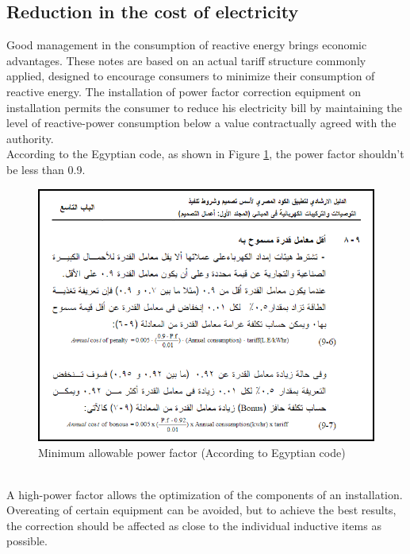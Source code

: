 \documentclass[12pt,fleqn]{book} %
\begin{document}
\subsection{Reduction in the cost of electricity}
Good management in the consumption of reactive energy brings economic advantages. These notes are based on an actual tariff structure commonly applied, designed to encourage consumers to minimize their consumption of reactive energy. The installation of power factor correction equipment on installation permits the consumer to reduce his electricity bill by maintaining the level of reactive-power consumption below a value contractually agreed with the authority.
\\ According to the Egyptian code, as shown in Figure \ref{fig:pf 3}, the power factor shouldn't be less than 0.9.
\begin{figure}[!h]
    \centering
    \includegraphics[width=0.9\linewidth]{pf 3.png}
    \caption{Minimum allowable power factor (According to Egyptian code)}
    \label{fig:pf 3}
    \end{figure}
    \\ A high-power factor allows the optimization of the components of an installation. Overeating of certain equipment can be avoided, but to achieve the best results, the correction should be affected as close to the individual inductive items as possible.
\end{document}
